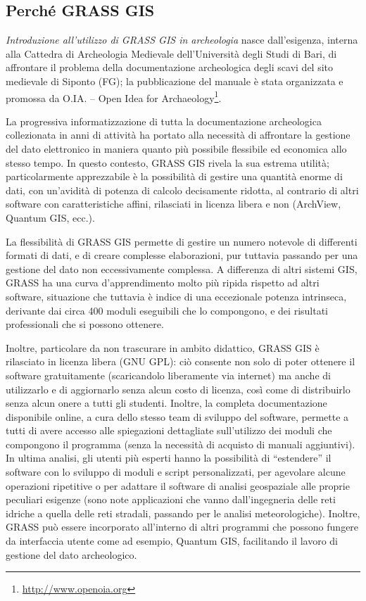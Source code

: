 \documentclass{article}
\begin{document}
	\clearpage

	\begin{multicols}{2}

		\section{Perché GRASS GIS}
			\emph{Introduzione all'utilizzo di GRASS GIS in archeologia} nasce dall'esigenza, interna alla Cattedra di Archeologia Medievale dell'Università degli Studi di Bari, di affrontare il problema della documentazione archeologica degli scavi del sito medievale di Siponto (FG); la pubblicazione del manuale è stata organizzata e promossa da O.IA. -- Open Idea for Archaeology\footnote{\url{http://www.openoia.org}}.

			La progressiva informatizzazione di tutta la documentazione archeologica collezionata in anni di attività ha portato alla necessità di affrontare la gestione del dato elettronico in maniera quanto più possibile flessibile ed economica allo stesso tempo. In questo contesto, GRASS GIS rivela la sua estrema utilità; particolarmente apprezzabile è la possibilità di gestire una quantità enorme di dati, con un'avidità di potenza di calcolo decisamente ridotta, al contrario di altri software con caratteristiche affini, rilasciati in licenza libera e non (ArchView, Quantum GIS, ecc.).

			La flessibilità di GRASS GIS permette di gestire un numero notevole di differenti formati di dati, e di creare complesse elaborazioni, pur tuttavia passando per una gestione del dato non eccessivamente complessa. A differenza di altri sistemi GIS, GRASS ha una curva d'apprendimento molto più ripida rispetto ad altri software, situazione che tuttavia è indice di una eccezionale potenza intrinseca, derivante dai circa 400 moduli eseguibili che lo compongono, e dei risultati professionali che si possono ottenere.

			Inoltre, particolare da non trascurare in ambito didattico, GRASS GIS è rilasciato in licenza libera (GNU GPL): ciò consente non solo di poter ottenere il software gratuitamente (scaricandolo liberamente via internet) ma anche di utilizzarlo e di aggiornarlo senza alcun costo di licenza, così come di distribuirlo senza alcun onere a tutti gli studenti. Inoltre, la completa documentazione disponibile online, a cura dello stesso team di sviluppo del software, permette a tutti di avere accesso alle spiegazioni dettagliate sull'utilizzo dei moduli che compongono il programma (senza la necessità di acquisto di manuali aggiuntivi). In ultima analisi, gli utenti più esperti hanno la possibilità di ``estendere'' il software con lo sviluppo di moduli e script personalizzati, per agevolare alcune operazioni ripetitive o per adattare il software di analisi geospaziale alle proprie peculiari esigenze (sono note applicazioni che vanno dall'ingegneria delle reti idriche a quella delle reti stradali, passando per le analisi meteorologiche). Inoltre, GRASS può essere incorporato all'interno di altri programmi che possono fungere da interfaccia utente come ad esempio, Quantum GIS, facilitando il lavoro di gestione del dato archeologico.


\end{multicols}
\end{document}
